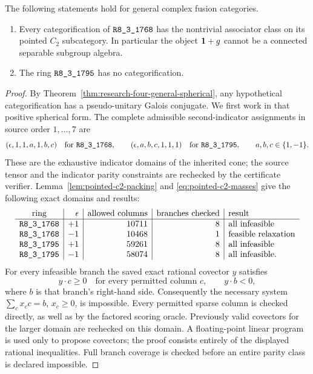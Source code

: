 \begin{theorem}\label{thm:pointed-c2-results}
The following statements hold for general complex fusion categories.
\begin{enumerate}
\item Every categorification of $\sha{R8_3_1768}$ has the nontrivial
associator class on its pointed $C_2$ subcategory.  In particular the
object $\mathbf1+g$ cannot be a connected separable subgroup algebra.
\item The ring $\sha{R8_3_1795}$ has no categorification.
\end{enumerate}
\end{theorem}
\begin{proof}
By Theorem~\ref{thm:research-four-general-spherical}, any hypothetical
categorification has a pseudo-unitary Galois conjugate.  We first work
in that positive spherical form.  The complete admissible second-indicator
assignments in source order $1,\ldots,7$ are
\[
 (\epsilon,1,1,a,1,b,c)\quad\text{for }\sha{R8_3_1768},\qquad
 (\epsilon,a,b,c,1,1,1)\quad\text{for }\sha{R8_3_1795},
 \qquad a,b,c\in\{1,-1\}.
\]
These are the exhaustive indicator domains of the inherited cone;
the source tensor and the indicator parity constraints are rechecked
by the certificate verifier.  Lemma~\ref{lem:pointed-c2-packing} and
\eqref{eq:pointed-c2-masses} give the following exact domains and results:
\[
\begin{array}{c|r|r|r|l}
\text{ring}&\epsilon&\text{allowed columns}&\text{branches checked}&\text{result}\\\hline
\sha{R8_3_1768}&+1&10711&8&\text{all infeasible}\\
\sha{R8_3_1768}&-1&10468&1&\text{feasible relaxation}\\
\sha{R8_3_1795}&+1&59261&8&\text{all infeasible}\\
\sha{R8_3_1795}&-1&58074&8&\text{all infeasible}.
\end{array}
\]
For every infeasible branch the saved exact rational covector $y$
satisfies
\[
 y\cdot c\geq0\quad\text{for every permitted column }c,
 \qquad y\cdot b<0,
\]
where $b$ is that branch's right-hand side.  Consequently the necessary
system $\sum_c x_c c=b$, $x_c\geq0$, is impossible.  Every permitted
sparse column is checked directly, as well as by the factored scoring
oracle.  Previously valid covectors for the larger domain are rechecked
on this domain.  A floating-point linear program is used only to propose
covectors; the proof consists entirely of the displayed rational
inequalities.  Full branch coverage is checked before an entire parity
class is declared impossible.


\end{proof}
